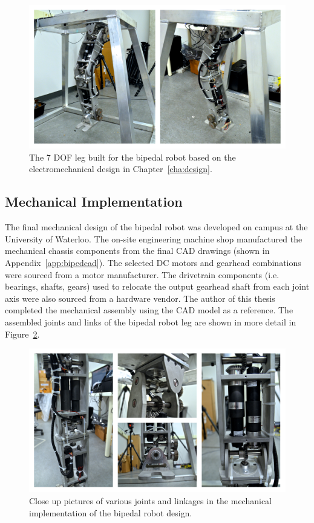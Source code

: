 \begin{figure}[!h]
	\centering
    \includegraphics[scale=0.39]{fig/hardware/bipedleg.png} 
  	\caption{The 7 DOF leg built for the bipedal robot based on the electromechanical design in Chapter~\ref{cha:design}.}
	\label{fig:bipedleg}
\end{figure}

\subsection{Mechanical Implementation} %
\label{sub:mechanical_implementation}

The final mechanical design of the bipedal robot was developed on campus at the University of Waterloo. The on-site engineering machine shop manufactured the mechanical chassis components from the final CAD drawings (shown in Appendix~\ref{app:bipedcad}). The selected DC motors and gearhead combinations were sourced from a motor manufacturer. The drivetrain components (i.e. bearings, shafts, gears) used to relocate the output gearhead shaft from each joint axis were also sourced from a hardware vendor. The author of this thesis completed the mechanical assembly using the CAD model as a reference. The assembled joints and links of the bipedal robot leg are shown in more detail in Figure~\ref{fig:bipedcloseup}.

\begin{figure}[!h]
	\centering
    \includegraphics[scale=0.38]{fig/hardware/bipedcloseup.png} 
  	\caption{Close up pictures of various joints and linkages in the mechanical implementation of the bipedal robot design.}
	\label{fig:bipedcloseup}
\end{figure}

